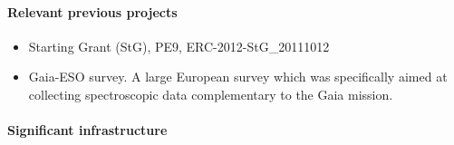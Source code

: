 \paragraph{Relevant previous projects}

\begin{itemize}
    \item Starting Grant (StG), PE9, ERC-2012-StG\_20111012
    \item Gaia-ESO survey. A large European survey which was specifically aimed at collecting spectroscopic data complementary to the Gaia mission.
\end{itemize}

\paragraph{Significant infrastructure}